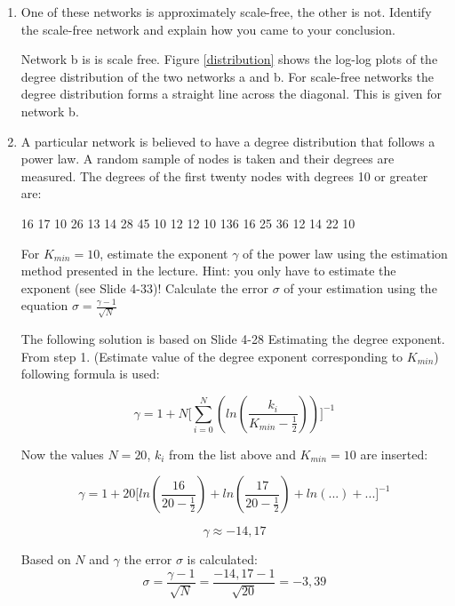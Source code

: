 \begin{enumerate}
	\item One of these networks is approximately scale-free, the other is not. Identify the scale-free network and explain how you came to your conclusion.
	
	Network b is is scale free. 
	Figure \ref{distribution} shows the log-log plots of the degree distribution of the two networks a and b. For scale-free networks the degree distribution forms a straight line across the diagonal. This is given for network b.
	
	\item A particular network is believed to have a degree distribution that follows a power law. A random sample of nodes is taken and their degrees are measured. The degrees of the first twenty nodes with degrees 10 or greater are: 
	
	16  17  10  26  13  14  28  45  10  12
	12  10  136  16  25  36  12  14  22  10
	
	For $K_{min} = 10$, estimate the exponent $\gamma$ of the power law using the estimation method presented in the lecture.
	Hint: you only have to estimate the exponent (see Slide 4-33)!
	Calculate the error $\sigma$ of your estimation using the equation $\sigma = \frac{\gamma - 1}{\sqrt{N}}$
	
	\vspace{0,75cm}
	The following solution is based on Slide 4-28 Estimating the degree exponent. From step 1. (Estimate value of the degree exponent corresponding to $K_{min}$) following formula is used:
	
	\begin{equation}
	\gamma = 1 + N \biggl[ \sum_{i=0}^N (ln(\frac{k_i}{K_{min} - \frac{1}{2}})) \biggr]^{-1}
	\end{equation}
	
	Now the values $N=20$, $k_i$ from the list above and $K_{min} = 10$ are inserted:
	
	\begin{equation*}
	\gamma = 1 + 20 \biggl[ ln(\frac{16}{20-\frac{1}{2}}) + ln(\frac{17}{20-\frac{1}{2}}) + ln(...) + ... \biggr]^{-1}
	\end{equation*}
	
	\begin{equation*}
	\gamma \approx -14,17
	\end{equation*}
	
	Based on $N$ and $\gamma$ the error $\sigma$ is calculated:
	\begin{equation*}
	\sigma = \frac{\gamma - 1}{\sqrt{N}} = \frac{-14,17 - 1}{\sqrt{20}} = -3,39
	\end{equation*}
	

\end{enumerate}